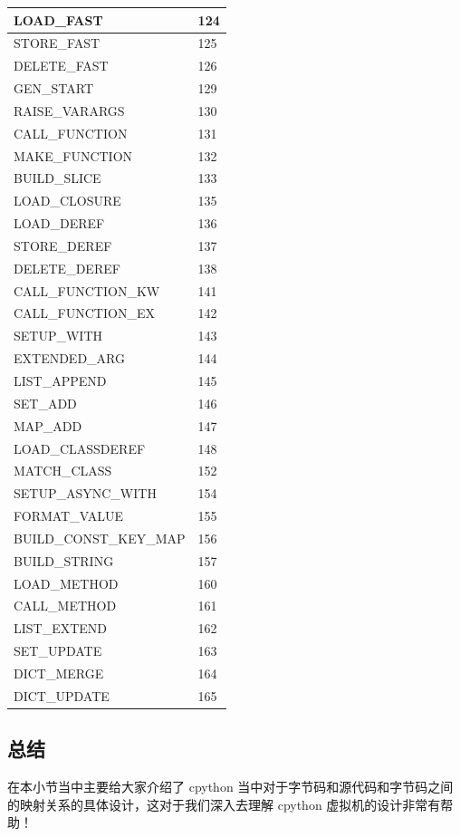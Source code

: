 \begin{table}
\begin{tabular}{|l|l|}
        LOAD\_FAST & 124 \\ \hline
        STORE\_FAST & 125 \\ \hline
        DELETE\_FAST & 126 \\ \hline
        GEN\_START & 129 \\ \hline
        RAISE\_VARARGS & 130 \\ \hline
        CALL\_FUNCTION & 131 \\ \hline
        MAKE\_FUNCTION & 132 \\ \hline
        BUILD\_SLICE & 133 \\ \hline
        LOAD\_CLOSURE & 135 \\ \hline
        LOAD\_DEREF & 136 \\ \hline
        STORE\_DEREF & 137 \\ \hline
        DELETE\_DEREF & 138 \\ \hline
        CALL\_FUNCTION\_KW & 141 \\ \hline
        CALL\_FUNCTION\_EX & 142 \\ \hline
        SETUP\_WITH & 143 \\ \hline
        EXTENDED\_ARG & 144 \\ \hline
        LIST\_APPEND & 145 \\ \hline
        SET\_ADD & 146 \\ \hline
        MAP\_ADD & 147 \\ \hline
        LOAD\_CLASSDEREF & 148 \\ \hline
        MATCH\_CLASS & 152 \\ \hline
        SETUP\_ASYNC\_WITH & 154 \\ \hline
        FORMAT\_VALUE & 155 \\ \hline
        BUILD\_CONST\_KEY\_MAP & 156 \\ \hline
        BUILD\_STRING & 157 \\ \hline
        LOAD\_METHOD & 160 \\ \hline
        CALL\_METHOD & 161 \\ \hline
        LIST\_EXTEND & 162 \\ \hline
        SET\_UPDATE & 163 \\ \hline
        DICT\_MERGE & 164 \\ \hline
        DICT\_UPDATE & 165 \\ \hline
        \end{tabular}
\end{table}
\subsection{总结}
在本小节当中主要给大家介绍了 cpython 当中对于字节码和源代码和字节码之间的映射关系的具体设计，这对于我们深入去理解 cpython 虚拟机的设计非常有帮助！